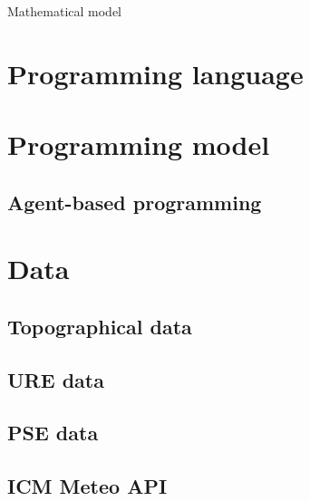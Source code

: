 Mathematical model \cite{mod-agentowe}

\section{Programming language}

\section{Programming model}

\subsection{Agent-based programming}


\section{Data}

\subsection{Topographical data}

\subsection{URE data}

\subsection{PSE data}

\subsection{ICM Meteo API}

